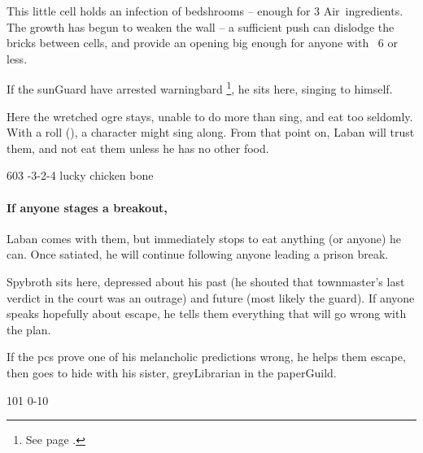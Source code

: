 \begin{multicols}{2}


This little cell holds an infection of \glspl{bedshroom} -- enough for 3 Air~\glspl{ingredient}.
The growth has begun to weaken the wall -- a sufficient push can dislodge the bricks between cells, and provide an opening big enough for anyone with ~6 or less.


If the \gls{sunGuard} have arrested \gls{warningbard}%
\footnote{See page \pageref{warningbard}.},
he sits here, singing to himself.


Here the wretched \gls{ogre} stays, unable to do more than sing, and eat too seldomly.
With a  roll (\tn[5]), a character might sing along.
From that point on, Laban will trust them, and not eat them unless he has no other food.

%
  {{6}{0}{3}}%
  {{-3}{-2}{-4}}%
  {%
  }%
  {}%
  {lucky chicken bone}%
  {}%

\paragraph{If anyone stages a breakout,}
Laban comes with them, but immediately stops to eat anything (or anyone) he can.
Once satiated, he will continue following anyone leading a prison break.


Spybroth sits here, depressed about his past (he shouted that \gls{townmaster}'s last verdict in the \gls{court} was an outrage) and future (most likely the \gls{guard}).
If anyone speaks hopefully about escape, he tells them everything that will go wrong with the plan.

If the \glspl{pc} prove one of his melancholic predictions wrong, he helps them escape, then goes to hide with his sister, \gls{greyLibrarian} in the \gls{paperGuild}.

%
  {{1}{0}{1}}%
  {{0}{-1}{0}}%
  {%
  }%
  {}%
  {\lootSmall}%
  {}%


\end{multicols}
